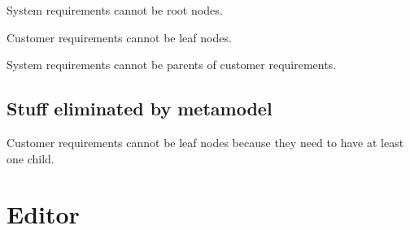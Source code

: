 \documentclass[11pt,a4paper]{scrartcl}
\begin{document}
System requirements cannot be root nodes.

Customer requirements cannot be leaf nodes.

System requirements cannot be parents of customer requirements.

\subsection{Stuff eliminated by metamodel}
Customer requirements cannot be leaf nodes because they need to have at least one child.

\section{Editor}
\end{document}
